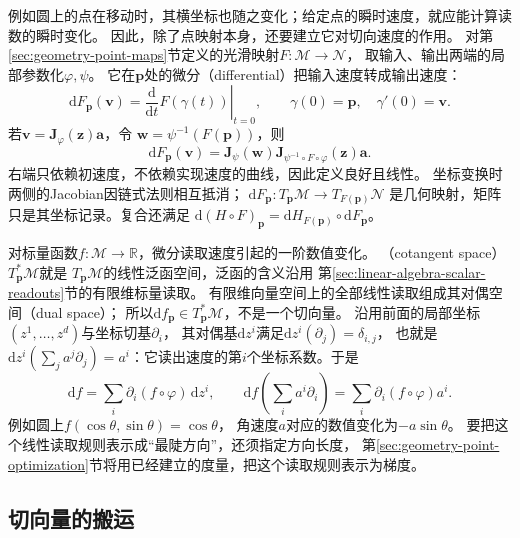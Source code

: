 例如圆上的点在移动时，其横坐标也随之变化；给定点的瞬时速度，就应能计算读数的瞬时变化。
因此，除了点映射本身，还要建立它对切向速度的作用。
对第\ref{sec:geometry-point-maps}节定义的光滑映射$F:\mathcal M\to\mathcal N$，
取输入、输出两端的局部参数化$\varphi,\psi$。
它在$\bm p$处的微分（differential）把输入速度转成输出速度：
\[
 \mathrm dF_{\bm p}(\bm v)
 =\left.\frac{\mathrm d}{\mathrm dt}F(\gamma(t))\right|_{t=0},
 \qquad\gamma(0)=\bm p,\quad\gamma'(0)=\bm v.
\]
若$\bm v=\bm J_\varphi(\bm z)\bm a$，令
$\bm w=\psi^{-1}(F(\bm p))$，则
\begin{equation}
 \mathrm dF_{\bm p}(\bm v)
 =\bm J_\psi(\bm w)
   \bm J_{\psi^{-1}\circ F\circ\varphi}(\bm z)\bm a.
 \label{eq:geometry-map-differential}
\end{equation}
右端只依赖初速度，不依赖实现速度的曲线，因此定义良好且线性。
坐标变换时两侧的Jacobian因链式法则相互抵消；
$\mathrm dF_{\bm p}:T_{\bm p}\mathcal M\to T_{F(\bm p)}\mathcal N$
是几何映射，矩阵只是其坐标记录。复合还满足
$\mathrm d(H\circ F)_{\bm p}=\mathrm dH_{F(\bm p)}\circ\mathrm dF_{\bm p}$。

对标量函数$f:\mathcal M\to\mathbb R$，微分读取速度引起的一阶数值变化。
（cotangent space）$T_{\bm p}^*\mathcal M$就是
$T_{\bm p}\mathcal M$的线性泛函空间，泛函的含义沿用
第\ref{sec:linear-algebra-scalar-readouts}节的有限维标量读取。
有限维向量空间上的全部线性读取组成其对偶空间（dual space）；
所以$\mathrm df_{\bm p}\in T_{\bm p}^*\mathcal M$，不是一个切向量。
沿用前面的局部坐标$(z^1,\ldots,z^d)$与坐标切基$\partial_i$，
其对偶基$\mathrm dz^i$满足$\mathrm dz^i(\partial_j)=\delta_{i,j}$，
也就是$\mathrm dz^i(\sum_j a^j\partial_j)=a^i$：它读出速度的第$i$个坐标系数。于是
\[
 \mathrm df=\sum_i\partial_i(f\circ\varphi)\,\mathrm dz^i,\qquad
 \mathrm df\!\left(\sum_i a^i\partial_i\right)
 =\sum_i\partial_i(f\circ\varphi)a^i.
\]
例如圆上$f(\cos\theta,\sin\theta)=\cos\theta$，
角速度$a$对应的数值变化为$-a\sin\theta$。
要把这个线性读取规则表示成“最陡方向”，还须指定方向长度，
第\ref{sec:geometry-point-optimization}节将用已经建立的度量，把这个读取规则表示为梯度。

\subsection{切向量的搬运}
\label{sec:geometry-tangent-transport}
\label{sec:geometry-connection-comparison}
\label{sec:geometry-riemannian-curvature}

\label{sec:geometry-cross-point-comparison-curvature}
\label{sec:geometry-parallel-transport}

